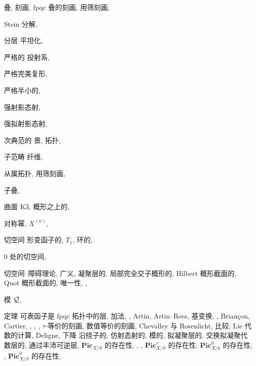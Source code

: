\begin{theindex}
\item 叠, 
\subitem 刻画, 
\subitem fpqc 叠的刻画, 
\subitem 用筛刻画, 
\item Stein 分解, 
\item 分层
\subitem 平坦化, 
\item 严格的
\subitem 投射系, 
\item 严格完美复形, 
\item 严格半小的, 
\item 强射影态射, 
\item 强拟射影态射, 
\item 次典范的
\subitem 景, 
\subitem 拓扑, 
\item 子范畴
\subitem 纤维, 
\item 从属拓扑, 
\subitem 用筛刻画, 
\item 子叠, 
\item 曲面
\subitem K3, 
\subitem 概形之上的, 
\item 对称幂, $X^{(n)}$, 
\indexspace
\item 切空间
\subitem 形变函子的, $T_1$, 
\subitem 环的, 
\item $0$ 处的切空间, 
\item 切空间--障碍理论, 
\subitem 广义, 
\subitem 凝聚层的, 
\subitem 局部完全交子概形的, 
\subitem Hilbert 概形截面的, 
\subitem Quot 概形截面的, 
\subitem 唯一性, , 
\item 模 $\mathcal Q$, 
\item 定理
\subitem 可表函子是 fpqc 拓扑中的层, 
\subitem 加法, , 
\subitem Artin, 
\subitem Artin--Rees, 
\subitem 基变换, , 
\subitem Briançon, 
\subitem Cartier, , , , 
\subitem $\tau$-等价的刻画, 
\subitem 数值等价的刻画, 
\subitem Chevalley 与 Rosenlicht, 
\subitem 比较, 
\subitem Lie 代数的计算, 
\subitem Deligne, 
\subitem 下降
\subsubitem 沿挠子的, 
\subsubitem 仿射态射的, 
\subsubitem 模的, 
\subsubitem 拟凝聚层的, 
\subsubitem 交换拟凝聚代数层的, 
\subsubitem 通过丰沛可逆层, 
\subitem $\mathbf{Pic}_{X/S}$ 的存在性, , , 
\subitem $\mathbf{Pic}_{X/S}^{\tau}$ 的存在性, 
\subitem $\mathbf{Pic}_{X/k}^0$ 的存在性, , 
\subitem $\mathbf{Pic}_{X/S}^0$ 的存在性, 


\end{theindex}
